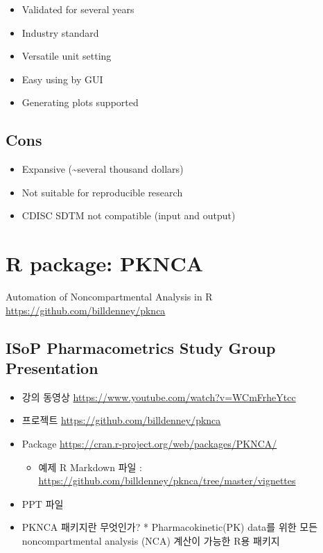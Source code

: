 \documentclass[
  10pt,
]{krantz}
\providecommand{\tightlist}{%
  \setlength{\itemsep}{0pt}\setlength{\parskip}{0pt}}
\begin{document}
\begin{itemize}
\tightlist
\item
  Validated for several years
\item
  Industry standard
\item
  Versatile unit setting
\item
  Easy using by GUI
\item
  Generating plots supported
\end{itemize}

\hypertarget{cons}{%
\subsection{Cons}\label{cons}}

\begin{itemize}
\tightlist
\item
  Expansive (\textasciitilde several thousand dollars)
\item
  Not suitable for reproducible research
\item
  CDISC SDTM not compatible (input and output)
\end{itemize}

\hypertarget{r-package-pknca}{%
\section{R package: PKNCA}\label{r-package-pknca}}

Automation of Noncompartmental Analysis in R \url{https://github.com/billdenney/pknca}

\hypertarget{isop-pharmacometrics-study-group-presentation}{%
\subsection{ISoP Pharmacometrics Study Group Presentation}\label{isop-pharmacometrics-study-group-presentation}}

\begin{itemize}
\tightlist
\item
  강의 동영상 \url{https://www.youtube.com/watch?v=WCmFrheYtcc}
\item
  프로젝트 \url{https://github.com/billdenney/pknca}
\item
  Package \url{https://cran.r-project.org/web/packages/PKNCA/}

  \begin{itemize}
  \tightlist
  \item
    예제 R Markdown 파일 : \url{https://github.com/billdenney/pknca/tree/master/vignettes}
  \end{itemize}
\item
  PPT 파일
\item
  PKNCA 패키지란 무엇인가? * Pharmacokinetic(PK) data를 위한 모든 noncompartmental analysis (NCA) 계산이 가능한 R용 패키지
\end{itemize}
\end{document}
